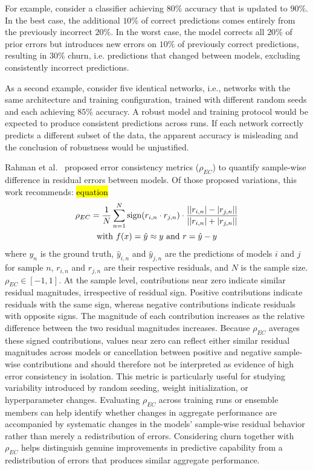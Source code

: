For example, consider a classifier achieving $80\%$ accuracy that is updated to $90\%$. In the best case, the additional $10\%$ of correct predictions comes entirely from the previously incorrect $20\%$. In the worst case, the model corrects all $20\%$ of prior errors but introduces new errors on $10\%$ of previously correct predictions, resulting in $30\%$ churn, i.e. predictions that changed between models, excluding consistently incorrect predictions.

As a second example, consider five identical networks, i.e., networks with the same architecture and training configuration, trained with different random seeds and each achieving $85\%$ accuracy. A robust model and training protocol would be expected to produce consistent predictions across runs. If each network correctly predicts a different subset of the data, the apparent accuracy is misleading and the conclusion of robustness would be unjustified.

Rahman et al.~\cite{Rahman2022} proposed error consistency metrics ($\rho_{EC}$) to quantify sample-wise difference in residual errors between models. Of those proposed variations, this work recommends: 
\hl{equation}
\begin{equation}\label{eqn:error consistency}
    \begin{gathered}
        \rho_{EC} = \frac{1}{N}\sum_{n=1}^N \textnormal{sign}(r_{i,n}\cdot r_{j,n}) \cdot \frac{||r_{i,n}|-|r_{j,n}||}{||r_{i,n}|+|r_{j,n}||} \\
        \textnormal{with\ } f(x) = \hat{y} \approx y %
            \ \textnormal{and} \ 
            r = \hat{y} - y
    \end{gathered}
\end{equation}
\noindent where $y_n$ is the ground truth, $\hat{y}_{i,n}$ and $\hat{y}_{j,n}$ are the predictions of models $i$ and $j$ for sample $n$, $r_{i,n}$ and $r_{j,n}$ are their respective residuals, and $N$ is the sample size. $\rho_{EC} \in [-1, 1]$. At the sample level, contributions near zero indicate similar residual magnitudes, irrespective of residual sign. Positive contributions indicate residuals with the same sign, whereas negative contributions indicate residuals with opposite signs. The magnitude of each contribution increases as the relative difference between the two residual magnitudes increases. Because $\rho_{EC}$ averages these signed contributions, values near zero can reflect either similar residual magnitudes across models or cancellation between positive and negative sample-wise contributions and should therefore not be interpreted as evidence of high error consistency in isolation. This metric is particularly useful for studying variability introduced by random seeding, weight initialization, or hyperparameter changes. Evaluating $\rho_{EC}$ across training runs or ensemble members can help identify whether changes in aggregate performance are accompanied by systematic changes in the models' sample-wise residual behavior rather than merely a redistribution of errors. Considering churn together with $\rho_{EC}$ helps distinguish genuine improvements in predictive capability from a redistribution of errors that produces similar aggregate performance.

